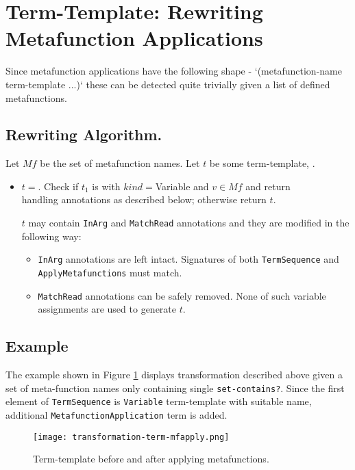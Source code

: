 \section{Term-Template: Rewriting Metafunction Applications}

Since metafunction applications have the following shape - `(metafunction-name term-template ...)` these can be detected quite trivially given a list of defined metafunctions. 

\subsection{Rewriting Algorithm.}
Let $Mf$ be the set of metafunction names. Let $t$ be some term-template, . 
\begin{itemize}
\item $t=$\TermSequence. Check if $t_1$ is \TermLiteral with $kind=$Variable and $v \in Mf$ and return \\ \ApplyMetafunction[$v$][$t$][false] handling annotations as described below; otherwise return $t$. 

$t$ may contain \texttt{InArg} and \texttt{MatchRead} annotations and they are modified in the following way:
\begin{itemize}
\item
\texttt{InArg} annotations are left intact. Signatures of both \texttt{TermSequence} and \texttt{ApplyMetafunctions} must match.
\item
\texttt{MatchRead} annotations can be safely removed. None of such variable assignments are used to generate $t$.
\end{itemize}
\end{itemize}
\subsection{Example}
The example shown in Figure \ref{transformation-term-mfapply} displays transformation described above given a set of meta-function names only containing single \texttt{set-contains?}. Since the first element of \texttt{TermSequence} is \texttt{Variable} term-template with suitable name, additional \texttt{MetafunctionApplication} term is added.

\begin{figure}[H]
\texttt{[image: transformation-term-mfapply.png]}
\caption{Term-template before and after applying metafunctions.}
\label{transformation-term-mfapply}
\end{figure}
